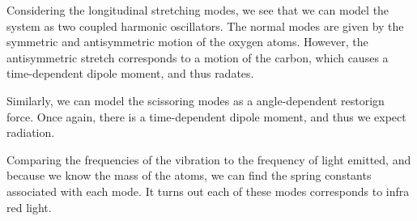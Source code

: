 Considering the longitudinal stretching modes, we see that we can model the system as two coupled harmonic oscillators. The normal modes are given by the symmetric and antisymmetric motion of the oxygen atoms. However, the antisymmetric stretch corresponds to a motion of the carbon, which causes a time-dependent dipole moment, and thus radates.

Similarly, we can model the scissoring modes as a angle-dependent restorign force. Once again, there is a time-dependent dipole moment, and thus we expect radiation.

Comparing the frequencies of the vibration to the frequency of light emitted, and because we know the mass of the atoms, we can find the spring constants associated with each mode. It turns out each of these modes corresponds to infra red light.
